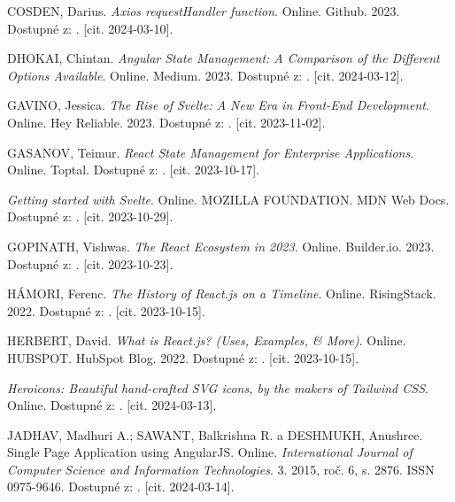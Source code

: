 \begin{thebibliography}{99}
\textsc{COSDEN}, Darius. \emph{Axios requestHandler function}. Online. Github. 2023. Dostupné z: . [cit. 2024-03-10].

\textsc{DHOKAI}, Chintan. \emph{Angular State Management: A Comparison of the Different Options Available}. Online. Medium. 2023. Dostupné z: . [cit. 2024-03-12].

\textsc{GAVINO}, Jessica. \emph{The Rise of Svelte: A New Era in Front-End Development}. Online. Hey Reliable. 2023. Dostupné z: . [cit. 2023-11-02].

\textsc{GASANOV}, Teimur. \emph{React State Management for Enterprise Applications}. Online. Toptal. Dostupné z: . [cit. 2023-10-17].

\emph{Getting started with Svelte}. Online. MOZILLA FOUNDATION. MDN Web Docs. Dostupné z: . [cit. 2023-10-29].

\textsc{GOPINATH}, Vishwas. \emph{The React Ecosystem in 2023}. Online. Builder.io. 2023. Dostupné z: . [cit. 2023-10-23].

\textsc{HÁMORI}, Ferenc. \emph{The History of React.js on a Timeline}. Online. RisingStack. 2022. Dostupné z: . [cit. 2023-10-15].

\textsc{HERBERT}, David. \emph{What is React.js? (Uses, Examples, \& More)}. Online. HUBSPOT. HubSpot Blog. 2022. Dostupné z: . [cit. 2023-10-15].

\emph{Heroicons: Beautiful hand-crafted SVG icons, by the makers of Tailwind CSS}. Online. Dostupné z: . [cit. 2024-03-13].

\textsc{JADHAV}, Madhuri A.; \textsc{SAWANT}, Balkrishna R. a \textsc{DESHMUKH}, Anushree. Single Page Application using AngularJS. Online. \emph{International Journal of Computer Science and Information Technologies}. 3. 2015, roč. 6, s. 2876. ISSN 0975-9646. Dostupné z: . [cit. 2024-03-14].


\end{thebibliography}

